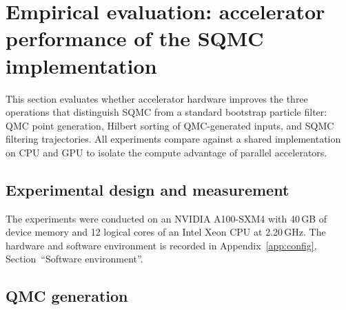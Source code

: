 \section{Empirical evaluation: accelerator performance of the SQMC implementation}
\label{sec:empirical-cpu-gpu}
This section evaluates whether accelerator hardware improves the three operations that distinguish SQMC from a standard bootstrap particle filter: QMC point generation, Hilbert sorting of QMC-generated inputs, and SQMC filtering trajectories. All experiments compare against a shared implementation on CPU and GPU to isolate the compute advantage of parallel accelerators. 


\subsection{Experimental design and measurement}
\label{sec:empirical-design}

The experiments were conducted on an NVIDIA A100-SXM4 with 40\,GB of device memory and 12 logical cores of an Intel Xeon CPU at 2.20\,GHz. The hardware and software environment is recorded in Appendix~\ref{app:config}, Section~``Software environment''.



\subsection{QMC generation}
\label{sec:qmc-benchmark}

